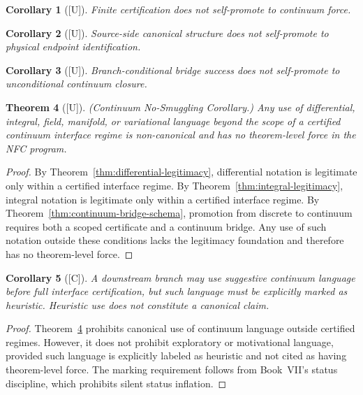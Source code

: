 \documentclass[12pt,oneside]{amsbook}
\theoremstyle{plain}
\newtheorem{theorem}{Theorem}[section]
\newtheorem{corollary}[theorem]{Corollary}
\theoremstyle{definition}
\theoremstyle{remark}
\newcommand{\status}[1]{\textup{[#1]}}
\begin{document}
\begin{corollary}[\status{U}]\label{cor:finite-no-self-promote}
Finite certification does not self-promote to continuum force.
\end{corollary}

\begin{corollary}[\status{U}]\label{cor:discrete-source-no-endpoint}
Source-side canonical structure does not self-promote to physical
endpoint identification.
\end{corollary}

\begin{corollary}[\status{U}]\label{cor:conditional-no-unconditional}
Branch-conditional bridge success does not self-promote to
unconditional continuum closure.
\end{corollary}

\begin{theorem}[\status{U}]\label{thm:no-smuggling}
\textup{(Continuum No-Smuggling Corollary.)}  Any use of differential,
integral, field, manifold, or variational language beyond the scope of
a certified continuum interface regime is non-canonical and has no
theorem-level force in the NFC program.
\end{theorem}

\begin{proof}
By Theorem~\ref{thm:differential-legitimacy}, differential notation is
legitimate only within a certified interface regime.  By
Theorem~\ref{thm:integral-legitimacy}, integral notation is legitimate
only within a certified interface regime.  By
Theorem~\ref{thm:continuum-bridge-schema}, promotion from discrete to
continuum requires both a scoped certificate and a continuum bridge.
Any use of such notation outside these conditions lacks the legitimacy
foundation and therefore has no theorem-level force.
\end{proof}

\begin{corollary}[\status{C}]\label{cor:heuristic-marking}
A downstream branch may use suggestive continuum language before full
interface certification, but such language must be explicitly marked as
heuristic.  Heuristic use does not constitute a canonical claim.
\end{corollary}

\begin{proof}
Theorem~\ref{thm:no-smuggling} prohibits canonical use of continuum
language outside certified regimes.  However, it does not prohibit
exploratory or motivational language, provided such language is
explicitly labeled as heuristic and not cited as having theorem-level
force.  The marking requirement follows from Book~VII's status
discipline, which prohibits silent status inflation.
\end{proof}
\end{document}
